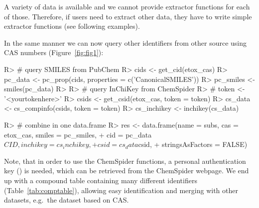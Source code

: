 \documentclass[article, shortnames]{jss}\usepackage[]{graphicx}\usepackage[]{color}
\begin{document}
A variety of data is available and we cannot provide extractor functions for each of those.
Therefore, if users need to extract other data, they have to write simple extractor functions (see following examples).

In the same manner we can now query other identifiers from other source using CAS numbers (Figure~\ref{fig:fig1}):


\begin{CodeChunk}
\begin{CodeInput}
R> # query SMILES from PubChem
R> cids <- get_cid(etox_cas)
R> pc_data <- pc_prop(cids, properties = c('CanonicalSMILES'))
R> pc_smiles <- smiles(pc_data)
R> 
R> # query InChiKey from ChemSpider
R> # token <- '<yourtokenhere>'
R> csids <- get_csid(etox_cas, token = token)
R> cs_data <- cs_compinfo(csids, token = token)
R> cs_inchikey <- inchikey(cs_data)
\end{CodeInput}
\end{CodeChunk}

\begin{CodeChunk}
\begin{CodeInput}
R> # combine in one data.frame
R> res <- data.frame(name = subs, cas = etox_cas, smiles = pc_smiles, 
+                    cid = pc_data$CID, inchikey = cs_inchikey, 
+                    csid = cs_data$csid, 
+                    stringsAsFactors = FALSE)
\end{CodeInput}
\end{CodeChunk}

Note, that in order to use the ChemSpider functions, a personal authentication key () is needed, which can be retrieved from the ChemSpider webpage. 
We end up with a compound table containing many different identifiers (Table~\ref{tab:comptable}), allowing easy identification and merging with other datasets, e.g.\ the  dataset based on CAS.
\end{document}
